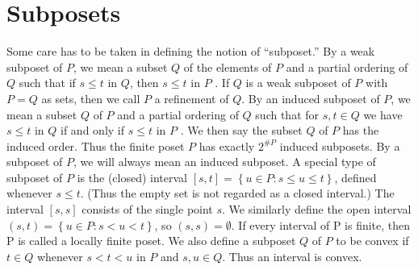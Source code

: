 \section{Subposets}

Some care has to be taken in defining the notion of “subposet.” By a weak subposet of $P$, we mean a subset $Q$ of the elements of $P$ and a partial ordering of $Q$ such that if $s \leq t$ in $Q$, then $s \leq t$ in $P$ . If $Q$ is a weak subposet of $P$ with $P = Q$ as sets, then we call $P$ a refinement of $Q$. By an induced subposet of $P$, we mean a subset $Q$ of $P$ and a partial ordering of $Q$ such that for $s, t \in Q$ we have $s \leq t$ in $Q$ if and only if $s \leq t$ in $P$ . We then say the subset $Q$ of $P$ has the induced order. Thus the finite poset $P$ has exactly $2^{\#P}$ induced subposets. By a subposet of $P$, we will always mean an induced subposet. A special type of subposet of $P$ is the (closed) interval $[s, t] = \left\{{u \in P : s \leq u \leq t}\right\}$, defined whenever $s \leq t$. (Thus the empty set is not regarded as a closed interval.) The interval $[s, s]$ consists of the single point $s$. We similarly define the open interval $(s, t) = \left\{{u \in P : s < u < t}\right\}$, so $(s, s) = \emptyset$. If every interval of P is finite, then P is called a locally finite poset. We also define a subposet $Q$ of $P$ to be convex if $t \in Q$ whenever $s < t < u$ in $P$ and $s, u \in Q$. Thus an interval is convex. \cite{Stanley:2011:ECV:2124415}